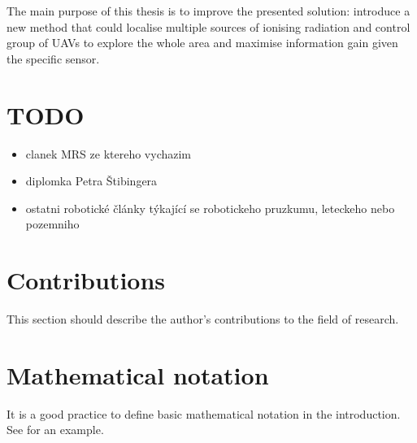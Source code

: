 The main purpose of this thesis is to improve the presented solution: introduce a new method that could localise multiple sources of ionising radiation and control group of \ac{UAV}s to explore the whole area and maximise information gain given the specific sensor.



\section{TODO}
\begin{itemize}
\item clanek MRS ze ktereho vychazim
\item diplomka Petra Štibingera
\item ostatni robotické články týkající se robotickeho pruzkumu, leteckeho nebo pozemniho
\end{itemize}
\section{Contributions}

This section should describe the author's contributions to the field of research.

\section{Mathematical notation}

It is a good practice to define basic mathematical notation in the introduction.
See  for an example.


